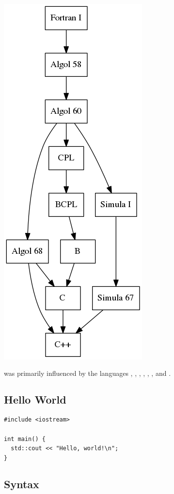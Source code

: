 \documentclass[../languages.tex]{subfiles}
\begin{document}
\begin{Figure}
  \centering
  \includegraphics[height=0.5\textheight]{cpp}
\end{Figure}

 was primarily influenced by the languages , ,
, , , , and .

\subsection{Hello World}
\label{sub:hello_world}

\begin{verbatim}
#include <iostream>

int main() {
  std::cout << "Hello, world!\n";
}
\end{verbatim}

\subsection{Syntax}\label{sub:syntax}

\newpage
\end{document}
